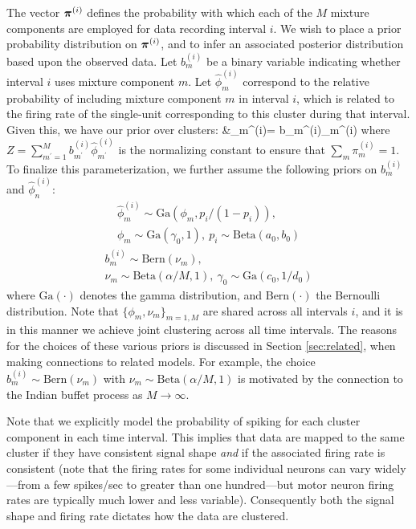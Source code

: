 \documentclass[journal]{IEEEtran}
\begin{document}
{The vector $\boldsymbol{\pi}^{(i)}$ defines the probability with which each of the $M$ mixture components are employed for data recording interval $i$. We wish to place a prior probability distribution on $\boldsymbol{\pi}^{(i)}$, and to infer an associated posterior distribution based upon the observed data. Let $b_m^{(i)}$ be a binary variable indicating whether interval $i$ uses mixture component $m$.  Let $\hat{\phi}_m^{(i)}$ correspond to the relative probability of including mixture component $m$ in interval $i$, which is related to the firing rate of the single-unit corresponding to this cluster during that interval.  Given this, we have our prior over clusters:}
\beqs %
&\pi_m^{(i)}=  b_m^{(i)}\hat{\phi}_m^{(i)} 
\label{eq:mixt}\eeqs 
{where $Z=\sum_{m^\prime=1}^M b_{m^\prime}^{(i)}\hat{\phi}_{m^\prime}^{(i)}$ is the normalizing constant to ensure that $\sum_m \pi_m^{(i)}=1$.  To finalize this parameterization, we further assume the following priors on $b_m^{(i)}$ and $\hat{\phi}_n^{(i)}$:}
\begin{multline} \label{eq:gen1}
\hat{\phi}_m^{(i)}\sim \mbox{Ga}(\phi_m,p_i/(1-p_i)), \\
\phi_m\sim\mbox{Ga}(\gamma_0,1) ,~p_i\sim\mbox{Beta}(a_0,b_0)
\end{multline}
\begin{multline} \label{eq:gen2}
b_m^{(i)}\sim\mbox{Bern}(\nu_m), \\
\nu_m\sim\mbox{Beta}(\alpha/M,1),~\gamma_0\sim\mbox{Ga}(c_0,1/d_0)
\end{multline}
where $\mbox{Ga}(\cdot)$ denotes the gamma distribution, and $\mbox{Bern}(\cdot)$ the Bernoulli distribution. Note that $\{\phi_m,\nu_m\}_{m=1,M}$ are shared across all intervals $i$, and it is in this manner we achieve joint clustering across all {time} intervals. 
The reasons for the choices of these various priors is discussed in Section \ref{sec:related}, when making connections to related models. For example, the choice $b_m^{(i)}\sim\mbox{Bern}(\nu_m)$ with $\nu_m\sim\mbox{Beta}(\alpha/M,1)$ is motivated by the connection to the Indian buffet process \cite{IBP} as $M\rightarrow\infty$.

{Note that we explicitly model the probability of spiking for each cluster component in each time interval.} This implies that data are mapped to the same cluster if they have consistent signal shape \emph{and} if the associated firing rate is consistent (note that the firing rates for some individual neurons can vary widely---from a few spikes/sec to {greater than one hundred---but} motor neuron firing rates are typically much lower and less variable). Consequently both the signal shape and firing rate dictates how the data are clustered.
\end{document}

